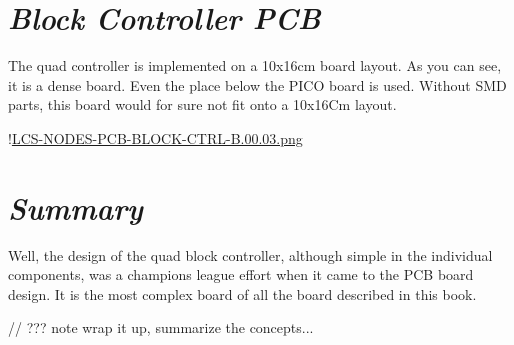 \section{\textit{Block Controller PCB}}

The quad controller is implemented on a 10x16cm board layout. As you can see, it is a dense board. Even the place below the PICO board is used. Without SMD parts, this board would for sure not fit onto a 10x16Cm layout.

!\href{./Boards/LCS-NODES-PCB-BLOCK-CTRL-B.00.03.png "}{LCS-NODES-PCB-BLOCK-CTRL-B.00.03.png}

\section{\textit{Summary}}

Well, the design of the quad block controller, although simple in the individual components, was a champions league effort when it came to the PCB board design. It is the most complex board of all the board described in this book.

// ??? note wrap it up, summarize the concepts...

